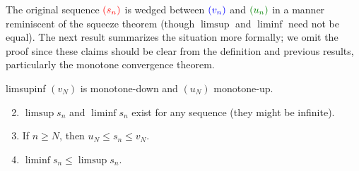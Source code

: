 The original sequence $\textcolor{red}{(s_n)}$ is wedged between
$\textcolor{blue}{(v_n)}$ and $\textcolor{Green}{(u_n)}$ in a manner reminiscent of the squeeze theorem (though $\limsup$ and $\liminf$ need not be equal). The next result summarizes the situation more formally; we omit the proof since these claims should be clear from the definition and previous results, particularly the monotone convergence theorem.


\begin{lemm}{}{limsupinf}
	\exstart $(v_N)$ is monotone-down and $(u_N)$ monotone-up.
	\begin{enumerate}\setcounter{enumi}{1}
	  \item\label{lemm:limsupinf1} $\limsup s_n$ and $\liminf s_n$ exist for any sequence (they might be infinite).
	  \item If $n\ge N$, then $u_N\le s_n\le v_N$.
	  \item $\liminf s_n\le\limsup s_n$.
	\end{enumerate}
\end{lemm}





